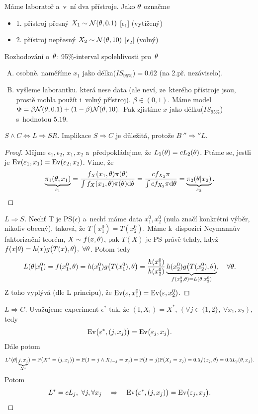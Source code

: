 \begin{example}
	Máme laboratoř a~v~ní dva přístroje. Jako $\theta$ označme\begin{itemize}
		\item 1. přístroj přesný $X_1\sim\mathcal{N}(\theta,0.1)$ [$\epsilon_1$] (vytížený)
		\item 2. přístroj nepřesný $X_2\sim\mathcal{N}(\theta,10)$ [$\epsilon_2$] (volný)
	\end{itemize}
Rozhodování o~$\theta$: 95\%-interval spolehlivosti pro~$\theta$\begin{enumerate}[A)]
	\item osobně. naměříme $x_1$ jako délka($IS_{95\%}$)$=0.62$ (na 2.př. nezáviselo).
	\item vyšleme laborantku. která nese data (ale neví, ze~kterého přístroje jsou, prostě mohla použít i~volný přístroj). $\beta\in(0,1)$. Máme model $\Phi=\beta\mathcal{N}(\theta,0.1)+(1-\beta)\mathcal{N}(\theta,10).$ Pak zjistíme $x$ jako délku($IS_{95\%}$) s~hodnotou $5.19$.
\end{enumerate}
\end{example}
\begin{theorem}
	$S\wedge C\Leftrightarrow L\Rightarrow SR$. Implikace $S\Rightarrow C$ je důležitá, protože $B~''\Rightarrow'' L$.
	\begin{proof}
		Mějme $\epsilon_1,\epsilon_2$, $x_1,x_2$ a~předpokládejme, že $L_1(\theta)=c L_2(\theta)$. Ptáme se, jestli je $\mathrm{Ev}(\varepsilon_1,x_1)=\mathrm{Ev}(\varepsilon_2,x_2)$. Víme, že $$ \underbrace{\pi_1(\theta,x_1)}_{\varepsilon_1}=\frac{f_X(x_1,\theta)\pi(\theta)}{\int f_X(x_1,\theta)\pi(\theta)\mathrm{d}\theta}=\frac{c f_{X_2}\pi}{\int c f_{X_2}\pi\mathrm{d}\theta}=\underbrace{\pi_2(\theta| x_2)}_{\varepsilon_2}.$$
	\end{proof}
\begin{proof}[$L\Rightarrow S$]
	Nechť T je PS($\epsilon$) a~nechť máme data $x_1^0,x_2^0$ (nula značí konkrétní výběr, nikoliv obecný), taková, že $T(x_1^0)=T(x_2^0)$. Máme k~dispozici Neymannův faktorizační teorém, $X\sim f(x,\theta)$, pak $T(X)$ je PS právě tehdy, když $f(x|\theta)=h(x)g\big(T(x),\theta \big),~\forall\theta$. Potom tedy 
	$$ L(\theta|x_1^0)=f(x_1^0,\theta)=h(x_1^0)g\big( T(x_1^0),\theta \big)=\frac{h(x_1^0)}{h(x_2^0)}\underbrace{h(x_2^0)g\big(T(x_2^0),\theta \big)}_{f(x_2^0,\theta)=L(\theta,x_2^0)},\quad\forall\theta.$$
	Z toho vyplývá (dle L principu), že $\mathrm{Ev}(\varepsilon,x_1^0)=\mathrm{Ev}(\varepsilon,x_2^0)$.

\end{proof}
\begin{proof}[$L\Rightarrow C$]
Uvažujeme experiment $\epsilon^*$ tak, že $(\mathrm{I},X_\mathrm{I})=X^*$, $(\forall j\in\{1,2\},~\forall x_1,x_2)$, tedy $$\mathrm{Ev}\big(\varepsilon^*,(j,x_j) \big)=\mathrm{Ev}\big(\varepsilon_j,x_j \big).$$
Dále potom $$ L^*(\theta|\underbrace{j,x_j}_{X^*})=\mathbb{P}\big(X^*=(j,x_j) \big)=\mathbb{P}(I=j\wedge X_{I=j}=x_j)=\mathbb{P}(I=j)\mathbb{P}(X_j=x_j)=0.5f(x_j,\theta)=0.5 L_j(\theta,x_j).$$
Potom 
$$L^*=c L_j,~ \forall j,\forall x_j\quad\Rightarrow\quad\mathrm{Ev}\big(\varepsilon^*,(j,x_j) \big)=\mathrm{Ev}\big(\varepsilon_j,x_j \big).$$
\end{proof}
\end{theorem}

